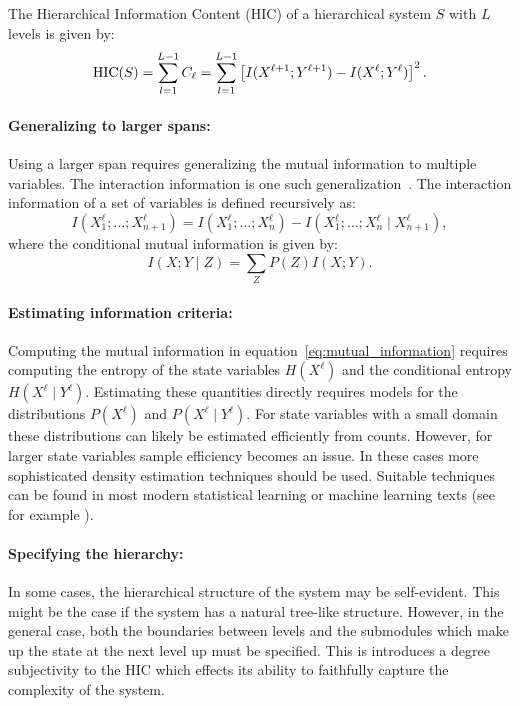 \begin{definition}
\label{def:hic}
  The Hierarchical Information Content (HIC) of a hierarchical system $S$ with
  $L$ levels is given by:
  \begin{equation}
    \label{eq:hic}
    \textup{HIC}(S) = \sum_{l=1}^{L-1} C_\ell = \sum_{l=1}^{L-1} \left[ I(X^{\ell+1}; Y^{\ell+1}) - I(X^\ell; Y^\ell) \right]^2.
  \end{equation}
\end{definition}

\paragraph{Generalizing to larger spans:} Using a larger span requires
generalizing the mutual information to multiple variables. The interaction
information is one such generalization~\citep{mcgill1954multivariate}. The
interaction information of a set of variables is defined recursively as:
\begin{equation}
    \label{eq:interaction_information}
    I(X_1^\ell; \ldots; X_{n+1}^\ell) = I(X_1^\ell; \ldots; X_n^\ell) - I(X_1^\ell; \ldots; X_n^\ell \mid X_{n+1}^\ell),
\end{equation}
where the conditional mutual information is given by:
\begin{equation}
    \label{eq:conditional_mutual_information}
    I(X; Y \mid Z) = \sum_{Z} P(Z) I(X; Y).
\end{equation}

\paragraph{Estimating information criteria:} Computing the mutual information
in equation~\ref{eq:mutual_information} requires computing the entropy of the
state variables $H(X^\ell)$ and the conditional entropy $H(X^\ell \mid
Y^\ell)$. Estimating these quantities directly requires models for the
distributions $P(X^\ell)$ and $P(X^\ell \mid Y^\ell)$. For state variables with
a small domain these distributions can likely be estimated efficiently from
counts. However, for larger state variables sample efficiency becomes an issue.
In these cases more sophisticated density estimation techniques should be used.
Suitable techniques can be found in most modern statistical learning or machine
learning texts (see for example \citet{friedman2001elements}).

\paragraph{Specifying the hierarchy:} In some cases, the hierarchical structure
of the system may be self-evident. This might be the case if the system has a
natural tree-like structure. However, in the general case, both the boundaries
between levels and the submodules which make up the state at the next level up
must be specified. This is introduces a degree subjectivity to the HIC which
effects its ability to faithfully capture the complexity of the system.

